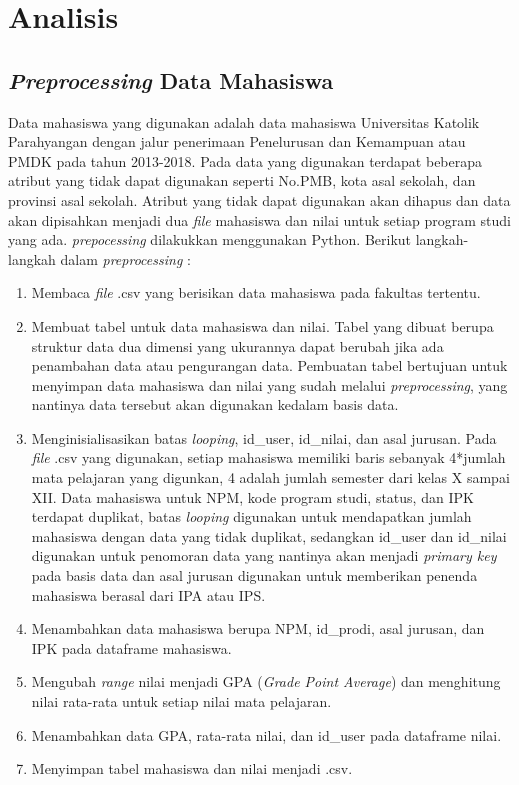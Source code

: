 \chapter{Analisis}
\label{chap:analisis}

\section{\textit{Preprocessing} Data Mahasiswa}
\label{sec:preprocessing}
Data mahasiswa yang digunakan adalah data mahasiswa Universitas Katolik Parahyangan dengan jalur penerimaan Penelurusan dan Kemampuan atau PMDK pada tahun 2013-2018. Pada data yang digunakan terdapat beberapa atribut yang tidak dapat digunakan seperti No.PMB,  kota asal sekolah, dan provinsi asal sekolah. Atribut yang tidak dapat digunakan akan dihapus dan data akan dipisahkan menjadi dua \textit{file} mahasiswa dan nilai untuk setiap program studi yang ada. \textit{prepocessing} dilakukkan menggunakan Python. Berikut langkah-langkah dalam \textit{preprocessing} :

\begin{enumerate}
    \item Membaca \textit{file} .csv yang berisikan data mahasiswa pada fakultas tertentu.
    
    \item Membuat tabel untuk data mahasiswa dan nilai. Tabel yang dibuat berupa struktur data dua dimensi yang ukurannya dapat berubah jika ada penambahan data atau pengurangan data. Pembuatan tabel bertujuan untuk menyimpan data mahasiswa dan nilai yang sudah melalui \textit{preprocessing}, yang nantinya data tersebut akan digunakan kedalam basis data.
    
    \item Menginisialisasikan batas \textit{looping}, id\_user, id\_nilai, dan asal jurusan. Pada \textit{file} .csv yang digunakan, setiap mahasiswa memiliki baris sebanyak 4*jumlah mata pelajaran yang digunkan, 4 adalah jumlah semester dari kelas X sampai XII. Data mahasiswa untuk NPM, kode program studi, status, dan IPK terdapat duplikat, batas \textit{looping} digunakan untuk mendapatkan jumlah mahasiswa dengan data yang tidak duplikat, sedangkan id\_user dan id\_nilai digunakan untuk penomoran data yang nantinya akan menjadi \textit{primary key} pada basis data dan asal jurusan digunakan untuk memberikan penenda mahasiswa berasal dari IPA atau IPS. 
    
    \item Menambahkan data mahasiswa berupa NPM, id\_prodi, asal jurusan, dan IPK pada dataframe mahasiswa.
    
    \item Mengubah \textit{range} nilai menjadi GPA (\textit{Grade Point Average}) dan menghitung nilai rata-rata untuk setiap nilai mata pelajaran.
    
    \item Menambahkan data GPA, rata-rata nilai, dan id\_user pada dataframe nilai.
    
    \item Menyimpan tabel mahasiswa dan nilai menjadi .csv.
\end{enumerate}

